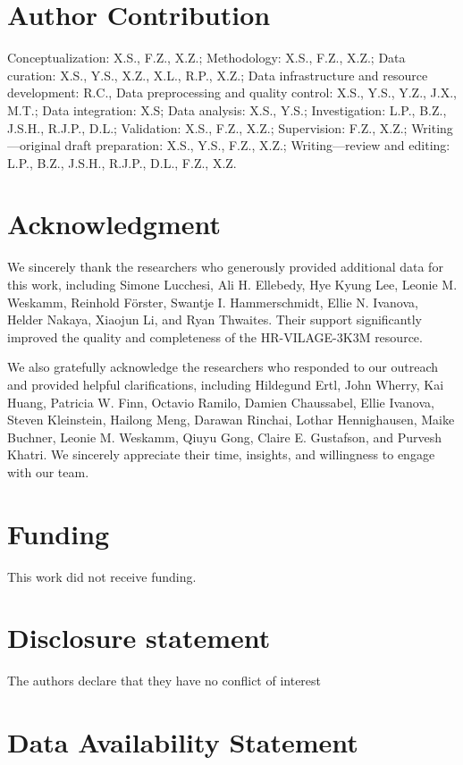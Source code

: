 \documentclass[
  12pt]{article}
\begin{document}
\section{Author Contribution}
Conceptualization: X.S., F.Z., X.Z.; Methodology: X.S., F.Z., X.Z.; Data curation: X.S., Y.S., X.Z., X.L., R.P., X.Z.; Data infrastructure and resource development: R.C., Data preprocessing and quality control: X.S., Y.S., Y.Z., J.X., M.T.; Data integration: X.S; Data analysis: X.S., Y.S.; Investigation: L.P., B.Z., J.S.H., R.J.P., D.L.; Validation: X.S., F.Z., X.Z.; Supervision: F.Z., X.Z.; Writing—original draft preparation: X.S., Y.S., F.Z., X.Z.; Writing—review and editing:  L.P., B.Z., J.S.H., R.J.P., D.L., F.Z., X.Z.

\section{Acknowledgment}

We sincerely thank the researchers who generously provided additional data for this work, including Simone Lucchesi, Ali H. Ellebedy, Hye Kyung Lee, Leonie M. Weskamm, Reinhold Förster, Swantje I. Hammerschmidt, Ellie N. Ivanova, Helder Nakaya, Xiaojun Li, and Ryan Thwaites. Their support significantly improved the quality and completeness of the HR-VILAGE-3K3M resource.

We also gratefully acknowledge the researchers who responded to our outreach and provided helpful clarifications, including Hildegund Ertl, John Wherry, Kai Huang, Patricia W. Finn, Octavio Ramilo, Damien Chaussabel, Ellie Ivanova, Steven Kleinstein, Hailong Meng, Darawan Rinchai, Lothar Hennighausen, Maike Buchner, Leonie M. Weskamm, Qiuyu Gong, Claire E. Gustafson, and Purvesh Khatri. We sincerely appreciate their time, insights, and willingness to engage with our team.

\section{Funding}

This work did not receive funding.

\section{Disclosure statement}\label{disclosure-statement}

The authors declare that they have no conflict of interest

\section{Data Availability Statement}\label{data-availability-statement}
\end{document}
